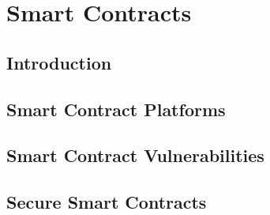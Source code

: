 \section{Smart Contracts}\label{sec::smartcontracts}

\subsection{Introduction}

\subsection{Smart Contract Platforms}

\subsection{Smart Contract Vulnerabilities}

\subsection{Secure Smart Contracts}